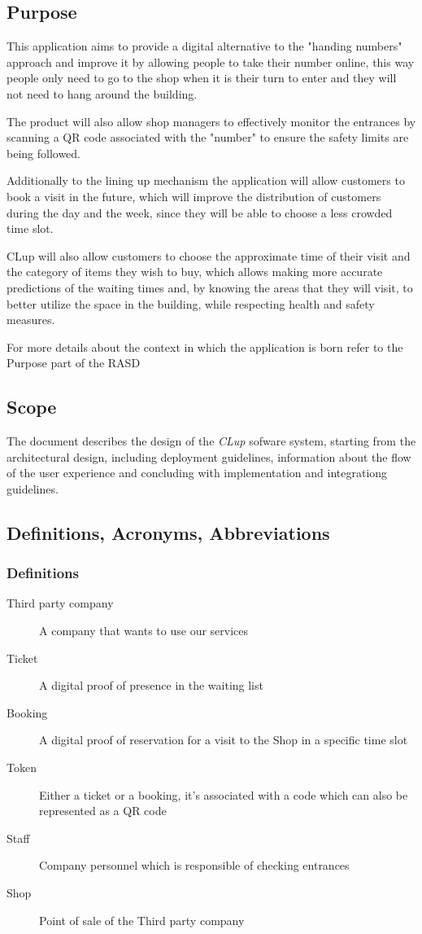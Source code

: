 \subsection{Purpose}

This application aims to provide a digital alternative to the "handing numbers" approach and improve it by allowing people to take their number online, this way people only need to go to the shop when it is their turn to enter and they will not need to hang around the building.

The product will also allow shop managers to effectively monitor the entrances by scanning a QR code associated with the "number" to ensure the safety limits are being followed.

Additionally to the lining up mechanism the application will allow customers to book a visit in the future, which will improve the distribution of customers during the day and the week, since they will be able to choose a less crowded time slot.

CLup will also allow customers to choose the approximate time of their visit and the category of items they wish to buy, which allows making more accurate predictions of the waiting times and, by knowing the areas that they will visit, to better utilize the space in the building, while respecting health and safety measures.

For more details about the context in which the application is born refer to the Purpose part of the RASD

\subsection{Scope}

The document describes the design of the \emph{CLup} sofware system, starting from the architectural design, including deployment guidelines, information about the flow of the user experience and concluding with implementation and integrationg guidelines.

\subsection{Definitions, Acronyms, Abbreviations}
\subsubsection{Definitions}

\begin{description}
    \item [Third party company] A company that wants to use our services
    \item [Ticket] A digital proof of presence in the waiting list
    \item [Booking] A digital proof of reservation for a visit to the Shop in a specific time slot
    \item [Token] Either a ticket or a booking, it's associated with a code which can also be represented as a QR code
    \item [Staff] Company personnel which is responsible of checking entrances
    \item [Shop] Point of sale of the Third party company
\end{description}
